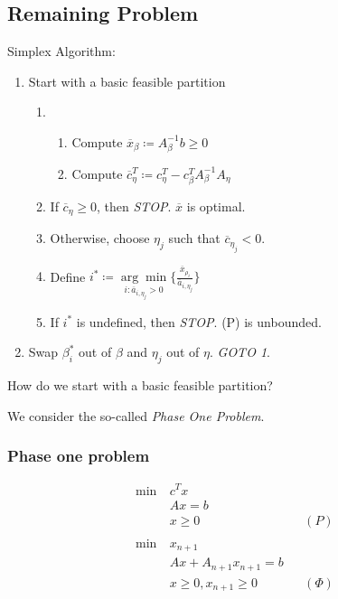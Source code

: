 \subsection{Remaining Problem}
\begin{prev}
	Simplex Algorithm:
	\begin{enumerate}
		\item Start with a basic feasible partition
		      \begin{enumerate}
			      \item \begin{enumerate}
				            \item Compute \(\overline{x}_{\beta} \coloneqq A^{-1}_{\beta} b \geq 0\)
				            \item Compute \(\overline{c}_{\eta}^{T} \coloneqq c_{\eta}^{T} - c_{\beta}^{T} A^{-1}_{\beta} A_{\eta}\)
			            \end{enumerate}
			      \item If \(\overline{c}_{\eta} \geq 0\), then \emph{STOP}. \(\overline{x}\) is optimal.
			      \item Otherwise, choose \(\eta_j\) such that \(\overline{c}_{\eta_j} < 0\).
			      \item Define \(i^{*}\coloneqq \underset{i:\overline{a}_{i, \eta_j}>0}{\arg\min} \{\frac{\overline{x}_{\rho_i}}{\overline{a}_{i, \eta_j}}\} \)
			      \item If \(i^{*}\) is undefined, then \emph{STOP}. (P) is unbounded.
		      \end{enumerate}
		\item Swap \(\beta_i^{*}\) out of \(\beta \) and \(\eta_j\) out of \(\eta \). \emph{GOTO 1}.
	\end{enumerate}
\end{prev}

\begin{problem}
How do we start with a basic feasible partition?
\end{problem}

\begin{answer}
	We consider the so-called \emph{Phase One Problem}.
\end{answer}
\subsubsection{Phase one problem}
\begin{align*}
	\min~ & c^T x                                \\
	      & Ax = b                               \\
	      & x\geq 0                  &  & (P)    \\\\
	\min~ & x_{n+1}                              \\
	      & Ax + A_{n+1}x_{n+1} = b              \\
	      & x\geq 0, x_{n+1} \geq  0 &  & (\Phi)
\end{align*}

